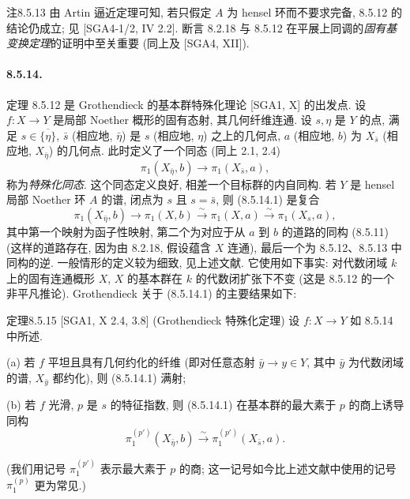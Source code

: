 \begin{origstatement}{注}{8.5.13}\label{ch08:rem8513}
由 Artin 逼近定理可知, 若只假定 $A$ 为 hensel 环而不要求完备, 8.5.12 的结论仍成立; 见 [SGA4-1/2, IV 2.2]. 断言 8.2.18 与 8.5.12 在平展上同调的\emph{固有基变换定理}的证明中至关重要 (同上及 [SGA4, XII]).
\end{origstatement}

\paragraph{8.5.14.}
定理 8.5.12 是 Grothendieck 的基本群特殊化理论 [SGA1, X] 的出发点. 设 $f:X\to Y$ 是局部 Noether 概形的固有态射, 其几何纤维连通. 设 $s,\eta$ 是 $Y$ 的点, 满足 $s\in\overline{\{\eta\}}$, $\bar s$ (相应地, $\bar\eta$) 是 $s$ (相应地, $\eta$) 之上的几何点, $a$ (相应地, $b$) 为 $X_{\bar s}$ (相应地, $X_{\bar\eta}$) 的几何点. 此时定义了一个同态 (同上 2.1, 2.4)
\begin{equation}\pi_1(X_{\bar\eta},b)\longrightarrow\pi_1(X_{\bar s},a),\tag{8.5.14.1}\label{ch08:eq85141}\end{equation}
称为\emph{特殊化同态}. 这个同态定义良好, 相差一个目标群的内自同构. 若 $Y$ 是 hensel 局部 Noether 环 $A$ 的谱, 闭点为 $s$ 且 $s=\bar s$, 则 (8.5.14.1) 是复合
\[\pi_1(X_{\bar\eta},b)\longrightarrow\pi_1(X,b)\xrightarrow\sim\pi_1(X,a)\xrightarrow\sim\pi_1(X_s,a),\]
其中第一个映射为函子性映射, 第二个为对应于从 $a$ 到 $b$ 的道路的同构 (8.5.11) (这样的道路存在, 因为由 8.2.18, 假设蕴含 $X$ 连通), 最后一个为 8.5.12、8.5.13 中同构的逆. 一般情形的定义较为细致, 见上述文献. 它使用如下事实: 对代数闭域 $k$ 上的固有连通概形 $X$, $X$ 的基本群在 $k$ 的代数闭扩张下不变 (这是 8.5.12 的一个非平凡推论). Grothendieck 关于 (8.5.14.1) 的主要结果如下:
\begin{origstatement}{定理}{8.5.15}\label{ch08:th8515}
[SGA1, X 2.4, 3.8] (Grothendieck 特殊化定理) 设 $f:X\to Y$ 如 8.5.14 中所述.

(a) 若 $f$ 平坦且具有几何约化的纤维 (即对任意态射 $\bar y\to y\in Y$, 其中 $\bar y$ 为代数闭域的谱, $X_{\bar y}$ 都约化), 则 (8.5.14.1) 满射;

(b) 若 $f$ 光滑, $p$ 是 $s$ 的特征指数, 则 (8.5.14.1) 在基本群的最大素于 $p$ 的商上诱导同构
\[\pi_1^{(p')}(X_{\bar\eta},b)\xrightarrow\sim\pi_1^{(p')}(X_{\bar s},a).\]
\end{origstatement}
(我们用记号 $\pi_1^{(p')}$ 表示最大素于 $p$ 的商; 这一记号如今比上述文献中使用的记号 $\pi_1^{(p)}$ 更为常见.)

